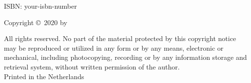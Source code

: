 \begin{small}
\noindent ISBN: your-isbn-number\\
\smallskip{}

\noindent Copyright \copyright~2020 by \theauthor\\
\smallskip{}

\noindent All rights reserved. No part of the material protected by this copyright notice may be reproduced or utilized in any form or by any means, electronic or mechanical, including photocopying, recording or by any information storage and retrieval system, without written permission of the author.
\\

\noindent Printed in the Netherlands

\end{small}

%





